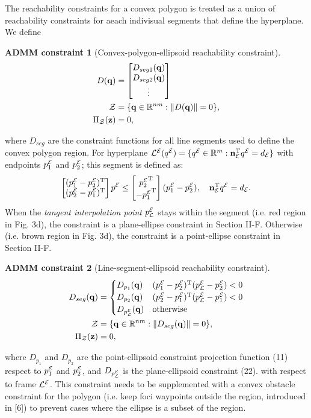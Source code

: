 \documentclass{article}
\newtheorem{constraint}{ADMM constraint}
\newcommand{\news}{\color{blue}}
\begin{document}
{\news  
The reachability constraints for a convex polygon is treated as a union of reachability constraints for aeach indivisual segments that define the hyperplane. We define
\setcounter{constraint}{3}
\setcounter{equation}{29}
\begin{constraint}[Convex-polygon-ellipsoid reachability constraint]\label{constraint:polygon-ellipsoid}
\begin{align}
D(\mathbf{q}) &= \begin{bmatrix}D_{seg1}(\mathbf{q})\\D_{seg2}(\mathbf{q})\\ \vdots\end{bmatrix} \label{eq:region_ellipsoid_constraint}\\
  \mathcal{Z} &= \{\mathbf{q}\in\mathbb{R}^{nm}:\lVert D(\mathbf{q})\rVert = 0 \},\\
   \Pi_{\mathcal{Z}}(\mathbf{z}) & = 0, 
\end{align}
\end{constraint}
where $D_{seg}$ are the constraint functions for all line segments used to define the convex polygon region. 
For hyperplane ${\mathcal{L}^{\mathcal{E}}}({q^{\mathcal{E}}}) = \{ {q^{\mathcal{E}}}\in\mathbb{R}^m:  \mathbf{n}_{\mathcal{E}}^\mathrm{T} {q^{\mathcal{E}}} = d_{\mathcal{E}}\}$ with endpoints ${p_1^{\mathcal{E}}}$ and ${p_2^{\mathcal{E}}}$; this segment is defined as:
\begin{equation}
\begin{bmatrix}({p_1^{\mathcal{E}}}- {p_2^{\mathcal{E}}})^\mathrm{T}\\( {p_2^{\mathcal{E}}} - {p_1^{\mathcal{E}}})^\mathrm{T}\end{bmatrix}  {p^{\mathcal{E}}} \leq \begin{bmatrix} {p_2^{\mathcal{E}}}^\mathrm{T}\\- {p_1^{\mathcal{E}}}^\mathrm{T}\end{bmatrix}( {p_1^{\mathcal{E}}}- {p_2^{\mathcal{E}}}), \quad \mathbf{n}_{\mathcal{E}}^\mathrm{T} {q^{\mathcal{E}}} = d_{\mathcal{E}}.
\end{equation}
When the \emph{tangent interpolation point} ${p_{\mathcal{L}}^{\mathcal{E}}}$ stays within the segment (i.e. red region in Fig. 3d), the constraint is a plane-ellipse constraint in Section II-F. Otherwise (i.e. brown region in Fig. 3d), the constraint is a point-ellipse constraint in Section II-F.

\begin{constraint}[Line-segment-ellipsoid reachability constraint]
\begin{align}
D_{seg}(\mathbf{q}) &=  \begin{cases}
D_{p_{1}}(\mathbf{q}) & ({p_1^{\mathcal{E}}}-{p_2^{\mathcal{E}}})^\mathrm{T} ({p_{\mathcal{L}}^{\mathcal{E}}}-{p_2^{\mathcal{E}}})<0\\
D_{p_{2}}(\mathbf{q}) & ({p_2^{\mathcal{E}}}-{p_1^{\mathcal{E}}})^\mathrm{T} ({p_{\mathcal{L}}^{\mathcal{E}}} -{p_1^{\mathcal{E}}})<0\\
D_{p_{\mathcal{L}}^{\mathcal{E}}}(\mathbf{q}) & \textrm{otherwise}
\end{cases} \label{eq:segment_ellipsoid_constraint}\\
  \mathcal{Z} &= \{\mathbf{q}\in\mathbb{R}^{nm}:\lVert D_{seg}(\mathbf{q})\rVert = 0 \},\\
   \Pi_{\mathcal{Z}}(\mathbf{z}) & = 0, 
\end{align}
\end{constraint}
where $D_{p_{1}}$ and $D_{p_{2}}$ are the point-ellipsoid constraint projection function (11) respect to ${p_{1}^{\mathcal{E}}}$ and ${p_{2}^{\mathcal{E}}}$, and $D_{p_{\mathcal{L}}^{\mathcal{E}}}$ is the plane-ellipsoid constraint (22). with respect to frame ${\mathcal{L}^{\mathcal{E}}}$.
This constraint needs to be supplemented with a convex obstacle constraint for the polygon (i.e. keep foci waypoints outside the region, introduced in [6]) to prevent cases where the ellipse is a subset of the region.
}
\end{document}
